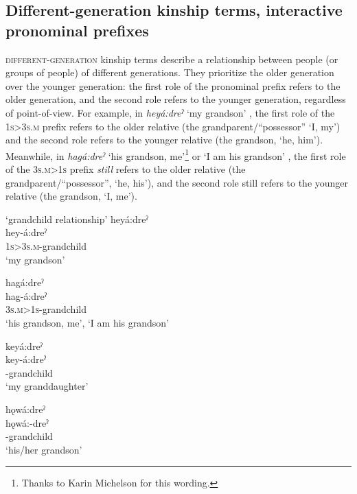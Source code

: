 \subsection{Different-generation kinship terms, interactive pronominal prefixes} \label{ch:Different-generations kinship terms, interactive pronominal prefixes}
\textsc{different-generation} kinship terms describe a relationship between people (or groups of people) of different generations. They prioritize the older generation over the younger generation: the first role of the pronominal prefix refers to the older generation, and the second role refers to the younger generation, regardless of point-of-view. For example, in \textit{heyá:dreˀ} ‘my grandson’ , the first role of the  \textsc{1s>3s.m} prefix refers to the older relative (the grandparent/“possessor” ‘I, my’) and the second role refers to the younger relative (the grandson, ‘he, him’). Meanwhile, in \textit{hagá:dreˀ} ‘his grandson, me’\footnote{Thanks to Karin Michelson for this wording.} or ‘I am his grandson’ , the first role of the  \textsc{3s.m>1s} prefix \emph{still} refers to the older relative (the grandparent/“possessor”, ‘he, his’), and the second role still refers to the younger relative (the grandson, ‘I, me’).

\newpage
\ea\label{ex:interkintermppex3}  ‘grandchild relationship’
\ea heyá:dreˀ\\\label{ex:interkintermppex3a}
\gll hey-á:dreˀ \\
 \textsc{1s>3s.m}-grandchild\\
\glt `my grandson'

\ex hagá:dreˀ \\\label{ex:interkintermppex3b}
\gll hag-á:dreˀ\\
 \textsc{3s.m>1s}-grandchild\\
\glt ‘his grandson, me’, `I am his grandson'

\ex keyá:dreˀ\\\label{ex:interkintermppex3c}
\gll key-á:dreˀ\\
 -grandchild\\
\glt `my granddaughter'

\ex hǫwá:dreˀ\\\label{ex:interkintermppex3d}
\gll hǫwá:-dreˀ\\
 -grandchild\\
\glt `his/her grandson'


